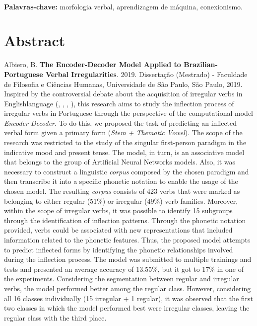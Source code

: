\documentclass[12pt,twoside,a4paper]{book}
\begin{document}
\\
 \textbf{Palavras-chave:}
morfologia verbal, aprendizagem de máquina, conexionismo.

\chapter*{Abstract}
\noindent Albiero, B. \textbf{The Encoder-Decoder Model Applied to Brazilian-Portuguese Verbal Irregularities}. 
2019.
Dissertação (Mestrado) - Faculdade de Filosofia e Ciências Humanas,
Universidade de São Paulo, São Paulo, 2019.
\\

Inspired by the controversial debate about the acquisition of irregular verbs in Englishlanguage (\cite{chomsky:1968}, \cite{Pinker:1988},
\cite{Albright2003RulesVA}, \cite{kirov:2018}), this research aims to study the inflection process of irregular verbs in Portuguese through the perspective of the computational model \textit{Encoder-Decoder}. To do this, we proposed the task of predicting an inflected verbal form given a primary form (\textit{Stem + Thematic Vowel}). The scope of the research was restricted to the study of the singular first-person paradigm in the indicative mood and present tense. The model, in turn, is an associative model that belongs to the group of Artificial Neural Networks models. Also, it was necessary to construct a linguistic \textit{corpus} composed by the chosen paradigm and then transcribe it into a specific phonetic notation to enable the usage of the chosen model. The resulting \textit{corpus} consists of 423 verbs that were marked as belonging to either regular (51\%) or irregular (49\%) verb families. Moreover, within the scope of irregular verbs, it was possible to identify 15 subgroups through the identification of inflection patterns. Through the phonetic notation provided, verbs could be associated with new representations that included information related to the phonetic features. Thus, the proposed model attempts to predict inflected forms by identifying the phonetic relationships involved during the inflection process. The model was submitted to multiple trainings and tests and presented an average accuracy of 13.55\%, but it got to 17\% in one of the experiments. Considering the segmentation between regular and irregular verbs, the model performed better among the regular class. However, considering all 16 classes individually (15 irregular + 1 regular), it was observed that the first two classes in which the model performed best were irregular classes, leaving the regular class with the third place.
\end{document}
